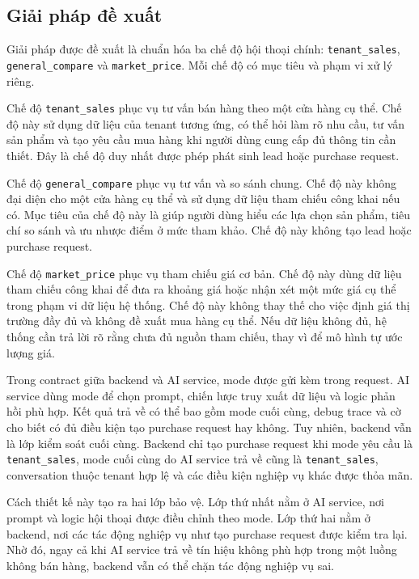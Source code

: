 \documentclass[../DoAn.tex]{subfiles}
\begin{document}
\subsection{Giải pháp đề xuất}
\label{subsection:5.3.2}

Giải pháp được đề xuất là chuẩn hóa ba chế độ hội thoại chính: \texttt{tenant\_sales}, \texttt{general\_compare} và \texttt{market\_price}. Mỗi chế độ có mục tiêu và phạm vi xử lý riêng.

Chế độ \texttt{tenant\_sales} phục vụ tư vấn bán hàng theo một cửa hàng cụ thể. Chế độ này sử dụng dữ liệu của tenant tương ứng, có thể hỏi làm rõ nhu cầu, tư vấn sản phẩm và tạo yêu cầu mua hàng khi người dùng cung cấp đủ thông tin cần thiết. Đây là chế độ duy nhất được phép phát sinh lead hoặc purchase request.

Chế độ \texttt{general\_compare} phục vụ tư vấn và so sánh chung. Chế độ này không đại diện cho một cửa hàng cụ thể và sử dụng dữ liệu tham chiếu công khai nếu có. Mục tiêu của chế độ này là giúp người dùng hiểu các lựa chọn sản phẩm, tiêu chí so sánh và ưu nhược điểm ở mức tham khảo. Chế độ này không tạo lead hoặc purchase request.

Chế độ \texttt{market\_price} phục vụ tham chiếu giá cơ bản. Chế độ này dùng dữ liệu tham chiếu công khai để đưa ra khoảng giá hoặc nhận xét một mức giá cụ thể trong phạm vi dữ liệu hệ thống. Chế độ này không thay thế cho việc định giá thị trường đầy đủ và không đề xuất mua hàng cụ thể. Nếu dữ liệu không đủ, hệ thống cần trả lời rõ rằng chưa đủ nguồn tham chiếu, thay vì để mô hình tự ước lượng giá.

Trong contract giữa backend và AI service, mode được gửi kèm trong request. AI service dùng mode để chọn prompt, chiến lược truy xuất dữ liệu và logic phản hồi phù hợp. Kết quả trả về có thể bao gồm mode cuối cùng, debug trace và cờ cho biết có đủ điều kiện tạo purchase request hay không. Tuy nhiên, backend vẫn là lớp kiểm soát cuối cùng. Backend chỉ tạo purchase request khi mode yêu cầu là \texttt{tenant\_sales}, mode cuối cùng do AI service trả về cũng là \texttt{tenant\_sales}, conversation thuộc tenant hợp lệ và các điều kiện nghiệp vụ khác được thỏa mãn.

Cách thiết kế này tạo ra hai lớp bảo vệ. Lớp thứ nhất nằm ở AI service, nơi prompt và logic hội thoại được điều chỉnh theo mode. Lớp thứ hai nằm ở backend, nơi các tác động nghiệp vụ như tạo purchase request được kiểm tra lại. Nhờ đó, ngay cả khi AI service trả về tín hiệu không phù hợp trong một luồng không bán hàng, backend vẫn có thể chặn tác động nghiệp vụ sai.
\end{document}

